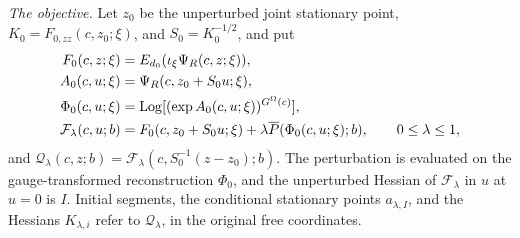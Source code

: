 \begin{theorem}
\emph{The objective.} Let $z_0$ be the unperturbed joint stationary point, $K_0=F_{0,zz}(c,z_0;\xi)$, and $S_0=K_0^{-1/2}$, and put
\[
 \begin{split}
 F_0(c,z;\xi)&=E_{d_0}(\iota_\xi\Psi_R(c,z;\xi)),\\
 A_0(c,u;\xi)&=\Psi_R(c,z_0+S_0u;\xi),\\
 \Phi_0(c,u;\xi)&=\operatorname{Log}[(\exp A_0(c,u;\xi))^{G^\Omega(c)}],\\
 \mathcal F_\lambda(c,u;b)
   &=F_0(c,z_0+S_0u;\xi)
                         +\lambda\overline P(\Phi_0(c,u;\xi);b),
                        \qquad0\le\lambda\le1,
 \end{split}
\]
and $\mathcal Q_\lambda(c,z;b)=\mathcal F_\lambda(c,S_0^{-1}(z-z_0);b)$. The perturbation is evaluated on the gauge-transformed reconstruction $\Phi_0$, and the unperturbed Hessian of $\mathcal F_\lambda$ in $u$ at $u=0$ is $I$. Initial segments, the conditional stationary points $a_{\lambda,I}$, and the Hessians $K_{\lambda,i}$ refer to $\mathcal Q_\lambda$, in the original free coordinates.


\end{theorem}
